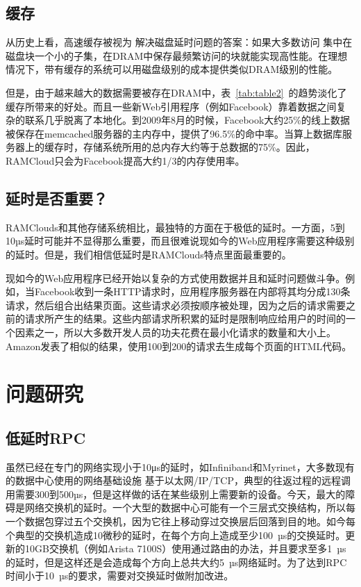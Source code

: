 \documentclass[translation]{zjutreport}
\begin{document}
\section{缓存}
从历史上看，高速缓存被视为
解决磁盘延时问题的答案：如果大多数访问
集中在磁盘块一个小的子集，在DRAM中保存最频繁访问的块就能实现高性能。在理想情况下，带有缓存的系统可以用磁盘级别的成本提供类似DRAM级别的性能。

但是，由于越来越大的数据需要被存在DRAM中，表~\ref{tab:table2}~的趋势淡化了缓存所带来的好处。而且一些新Web引用程序（例如Facebook）靠着数据之间复杂的联系几乎脱离了本地化。到2009年8月的时候，Facebook大约25\%的线上数据被保存在memcached服务器的主内存中，提供了96.5\%的命中率。当算上数据库服务器上的缓存时，存储系统所用的总内存大约等于总数据的75\%。因此，RAMCloud只会为Facebook提高大约1/3的内存使用率。

\section{延时是否重要？}
RAMClouds和其他存储系统相比，最独特的方面在于极低的延时。一方面，5到10µs延时可能并不显得那么重要，而且很难说现如今的Web应用程序需要这种级别的延时。但是，我们相信低延时是RAMClouds特点里面最重要的。

现如今的Web应用程序已经开始以复杂的方式使用数据并且和延时问题做斗争。例如，当Facebook收到一条HTTP请求时，应用程序服务器在内部将其均分成130条请求，然后组合出结果页面。这些请求必须按顺序被处理，因为之后的请求需要之前的请求所产生的结果。这些内部请求所积累的延时是限制响应给用户的时间的一个因素之一，所以大多数开发人员的功夫花费在最小化请求的数量和大小上。Amazon发表了相似的结果，使用100到200的请求去生成每个页面的HTML代码。

\chapter{问题研究}
\section{低延时RPC}
虽然已经在专门的网络实现小于10μs的延时，如Infiniband和Myrinet，大多数现有的数据中心使用的网络基础设施
基于以太网/IP/TCP，典型的往返过程的远程调用需要300到500µs，但是这样做的话在某些级别上需要新的设备。今天，最大的障碍是网络交换机的延时。一个大型的数据中心可能有一个三层式交换结构，所以每一个数据包穿过五个交换机，因为它往上移动穿过交换层后回落到目的地。如今每个典型的交换机造成10微秒的延时，在每个方向上造成至少100~µs的交换延时。更新的10GB交换机（例如Arista 7100S）使用通过路由的办法，并且要求至多1~µs的延时，但是这样还是会造成每个方向上总共大约5~µs网络延时。为了达到RPC时间小于10~µs的要求，需要对交换延时做附加改进。
\end{document}
